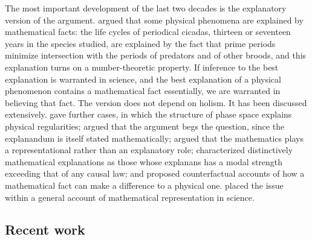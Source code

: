 \documentclass{situationist-preprint}
\begin{document}
The most important development of the last two decades is the explanatory version of the argument. \citet{Baker2005,Baker2009} argued that some physical phenomena are explained by mathematical facts: the life cycles of periodical cicadas, thirteen or seventeen years in the species studied, are explained by the fact that prime periods minimize intersection with the periods of predators and of other broods, and this explanation turns on a number-theoretic property. If inference to the best explanation is warranted in science, and the best explanation of a physical phenomenon contains a mathematical fact essentially, we are warranted in believing that fact. The version does not depend on holism. It has been discussed extensively. \citet{Lyon2008} gave further cases, in which the structure of phase space explains physical regularities; \citet{Bangu2008} argued that the argument begs the question, since the explanandum is itself stated mathematically; \citet{Saatsi2011} argued that the mathematics plays a representational rather than an explanatory role; \citet{Lange2013} characterized distinctively mathematical explanations as those whose explanans has a modal strength exceeding that of any causal law; and \citet{Baron2017} proposed counterfactual accounts of how a mathematical fact can make a difference to a physical one. \citet{Pincock2012} placed the issue within a general account of mathematical representation in science.

\subsection{Recent work}
\end{document}
